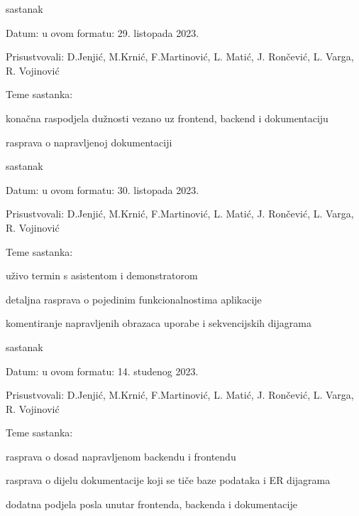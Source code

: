 \begin{packed_enum}
\begin{packed_item}
\begin{packed_item}
				\end{packed_item}
			\end{packed_item}
			
			\item  sastanak
			\item[] \begin{packed_item}

				\item Datum: u ovom formatu: 29. listopada 2023.
				\item Prisustvovali: D.Jenjić, M.Krnić, F.Martinović, L. Matić, J. Rončević, L. Varga, R. Vojinović
				\item Teme sastanka:
				\begin{packed_item}
					\item  konačna raspodjela dužnosti vezano uz frontend, backend i dokumentaciju
					\item  rasprava o napravljenoj dokumentaciji
				\end{packed_item}
			\end{packed_item}
			
			\vspace{1cm}
			
			\item  sastanak
			\item[] \begin{packed_item}
				\item Datum: u ovom formatu: 30. listopada 2023.
				\item Prisustvovali: D.Jenjić, M.Krnić, F.Martinović, L. Matić, J. Rončević, L. Varga, R. Vojinović
				\item Teme sastanka:
				\begin{packed_item}
					\item  uživo termin s asistentom i demonstratorom
					\item  detaljna rasprava o pojedinim funkcionalnostima aplikacije
					\item  komentiranje napravljenih obrazaca uporabe i sekvencijskih dijagrama
				\end{packed_item}
			\end{packed_item}
			
			\item  sastanak
			\item[] \begin{packed_item}
				\item Datum: u ovom formatu: 14. studenog 2023.
				\item Prisustvovali: D.Jenjić, M.Krnić, F.Martinović, L. Matić, J. Rončević, L. Varga, R. Vojinović
				\item Teme sastanka:
				\begin{packed_item}
					\item  rasprava o dosad napravljenom backendu i frontendu
					\item  rasprava o dijelu dokumentacije koji se tiče baze podataka i ER dijagrama
					\item  dodatna podjela posla unutar frontenda, backenda i dokumentacije
				\end{packed_item}
			\end{packed_item}
			

\end{packed_enum}
